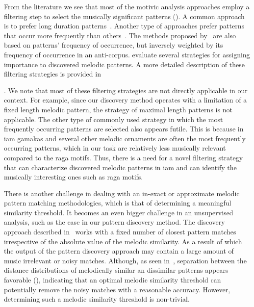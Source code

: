 From the literature we see that most of the motivic analysis approaches employ a filtering step to select the musically significant patterns (). A common approach is to prefer long duration patterns~\citep{Cambouropoulos2006,Karydis2006}. Another type of approaches prefer patterns that occur more frequently than others~\citep{Cambouropoulos2006,meredith2002algorithms}. The methods proposed by~\cite{conklin2010discovery,Conklin2010a} are also based on patterns' frequency of occurrence, but inversely weighted by its frequency of occurrence in an anti-corpus. \cite{collins2011modeling} evaluate several strategies for assigning importance to discovered melodic patterns. A more detailed description of these filtering strategies is provided in~{. We note that most of these filtering strategies are not directly applicable in our context. For example, since our discovery method operates with a limitation of a fixed length melodic pattern, the strategy of maximal length patterns is not applicable. The other type of commonly used strategy in which the most frequently occurring patterns are selected also appears futile. This is because in \gls{iam} \glspl{gamaka} and several other melodic ornaments are often the most frequently occurring patterns, which in our task are relatively less musically relevant compared to the \gls{raga} motifs. Thus, there is a need for a novel filtering strategy that can characterize discovered melodic patterns in \gls{iam} and can identify the musically interesting ones such as \gls{raga} motifs.	

There is another challenge in dealing with an in-exact or approximate melodic pattern matching methodologies, which is that of determining a meaningful similarity threshold. It becomes an even bigger challenge in an unsupervised analysis, such as the case in our pattern discovery method. The discovery approach described in~ works with a fixed number of closest pattern matches irrespective of the absolute value of the melodic similarity. As a result of which the output of the pattern discovery approach may contain a large amount of music irrelevant or noisy matches. Although, as seen in~, separation between the distance distributions of melodically similar an dissimilar patterns appears favorable (), indicating that an optimal melodic similarity threshold can potentially remove the noisy matches with a reasonable accuracy. However, determining such a melodic similarity threshold is non-trivial.

}
